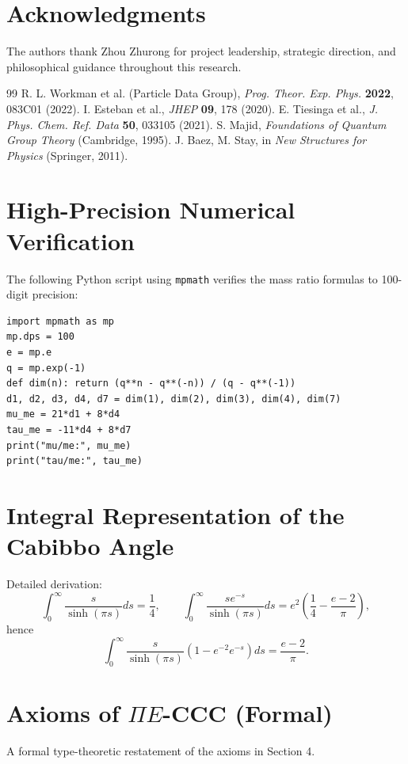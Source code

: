 ﻿\documentclass[twocolumn]{article}
\begin{document}
\section*{Acknowledgments}
The authors thank Zhou Zhurong for project leadership, strategic direction, and philosophical guidance throughout this research.

\begin{thebibliography}{99}
 R. L. Workman et al. (Particle Data Group), \textit{Prog. Theor. Exp. Phys.} \textbf{2022}, 083C01 (2022).
 I. Esteban et al., \textit{JHEP} \textbf{09}, 178 (2020).
 E. Tiesinga et al., \textit{J. Phys. Chem. Ref. Data} \textbf{50}, 033105 (2021).
 S. Majid, \textit{Foundations of Quantum Group Theory} (Cambridge, 1995).
 J. Baez, M. Stay, in \textit{New Structures for Physics} (Springer, 2011).
\end{thebibliography}

\appendix
\section{High-Precision Numerical Verification}
The following Python script using \texttt{mpmath} verifies the mass ratio formulas to 100-digit precision:
\begin{verbatim}
import mpmath as mp
mp.dps = 100
e = mp.e
q = mp.exp(-1)
def dim(n): return (q**n - q**(-n)) / (q - q**(-1))
d1, d2, d3, d4, d7 = dim(1), dim(2), dim(3), dim(4), dim(7)
mu_me = 21*d1 + 8*d4
tau_me = -11*d4 + 8*d7
print("mu/me:", mu_me)
print("tau/me:", tau_me)
\end{verbatim}

\section{Integral Representation of the Cabibbo Angle}
Detailed derivation:
\[
\int_0^\infty \frac{s}{\sinh(\pi s)}ds = \frac14,\qquad 
\int_0^\infty \frac{s e^{-s}}{\sinh(\pi s)}ds = e^2\left(\frac14 - \frac{e-2}{\pi}\right),
\]
hence
\[
\int_0^\infty \frac{s}{\sinh(\pi s)}(1 - e^{-2}e^{-s})ds = \frac{e-2}{\pi}.
\]

\section{Axioms of \(\Pi E\)-CCC (Formal)}
A formal type-theoretic restatement of the axioms in Section 4.
\end{document}
